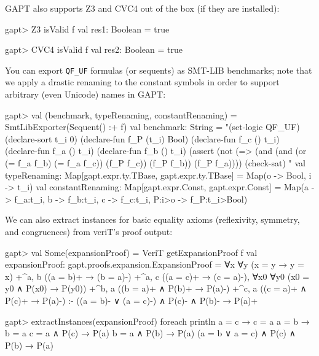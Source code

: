 \documentclass[a4paper,11pt]{book}
\begin{document}
GAPT also supports Z3 and CVC4 out of the box (if they are installed):
\begin{clilisting}
  gapt> Z3 isValid f
  val res1: Boolean = true

  gapt> CVC4 isValid f
  val res2: Boolean = true

\end{clilisting}

You can export \verb,QF_UF, formulas (or sequents) as SMT-LIB benchmarks;
note that we apply a drastic renaming to the constant symbols in order to
support arbitrary (even Unicode) names in GAPT:
\begin{clilisting}
  gapt> val (benchmark, typeRenaming, constantRenaming) = SmtLibExporter(Sequent() :+ f)
  val benchmark: String = "(set-logic QF_UF)
  (declare-sort t_i 0)
  (declare-fun f_P (t_i) Bool)
  (declare-fun f_c () t_i)
  (declare-fun f_a () t_i)
  (declare-fun f_b () t_i)
  (assert
  (not
  (=> (and (and (or (= f_a f_b) (= f_a f_c)) (f_P f_c)) (f_P f_b))
  (f_P f_a))))
  (check-sat)
  "
  val typeRenaming: Map[gapt.expr.ty.TBase, gapt.expr.ty.TBase] = Map(o -> Bool, i -> t_i)
  val constantRenaming: Map[gapt.expr.Const, gapt.expr.Const] = Map(a -> f_a:t_i, b -> f_b:t_i, c -> f_c:t_i, P:i>o -> f_P:t_i>Bool)

\end{clilisting}

We can also extract instances for basic equality axioms (reflexivity, symmetry,
and congruences) from veriT's proof output:
\begin{clilisting}
  gapt> val Some(expansionProof) = VeriT getExpansionProof f
  val expansionProof: gapt.proofs.expansion.ExpansionProof =
  ∀x ∀y (x = y → y = x)
  +^{a, b} ((a = b)+ → (b = a)-)
  +^{a, c} ((a = c)+ → (c = a)-),
  ∀x0 ∀y0 (x0 = y0 ∧ P(x0) → P(y0))
  +^{b, a} ((b = a)+ ∧ P(b)+ → P(a)-)
  +^{c, a} ((c = a)+ ∧ P(c)+ → P(a)-)
  :-
  ((a = b)- ∨ (a = c)-) ∧ P(c)- ∧ P(b)- → P(a)+

  gapt> extractInstances(expansionProof) foreach println
  a = c → c = a
  a = b → b = a
  c = a ∧ P(c) → P(a)
  b = a ∧ P(b) → P(a)
  (a = b ∨ a = c) ∧ P(c) ∧ P(b) → P(a)

\end{clilisting}
\end{document}
